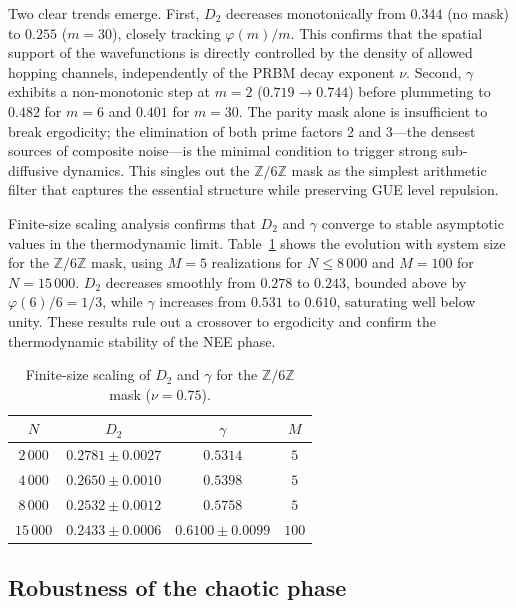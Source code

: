 \documentclass[11pt,a4paper]{article}
\begin{document}
Two clear trends emerge. First, $D_2$ decreases monotonically from $0.344$ (no mask) to $0.255$ ($m=30$), closely tracking $\varphi(m)/m$. This confirms that the spatial support of the wavefunctions is directly controlled by the density of allowed hopping channels, independently of the PRBM decay exponent $\nu$. Second, $\gamma$ exhibits a non-monotonic step at $m=2$ ($0.719 \to 0.744$) before plummeting to $0.482$ for $m=6$ and $0.401$ for $m=30$. The parity mask alone is insufficient to break ergodicity; the elimination of both prime factors 2 and 3---the densest sources of composite noise---is the minimal condition to trigger strong sub-diffusive dynamics. This singles out the $\mathbb{Z}/6\mathbb{Z}$ mask as the simplest arithmetic filter that captures the essential structure while preserving GUE level repulsion.

Finite-size scaling analysis confirms that $D_2$ and $\gamma$ converge to stable asymptotic values in the thermodynamic limit. Table~\ref{tab:scaling} shows the evolution with system size for the $\mathbb{Z}/6\mathbb{Z}$ mask, using $M=5$ realizations for $N \le 8\,000$ and $M=100$ for $N=15\,000$. $D_2$ decreases smoothly from $0.278$ to $0.243$, bounded above by $\varphi(6)/6 = 1/3$, while $\gamma$ increases from $0.531$ to $0.610$, saturating well below unity. These results rule out a crossover to ergodicity and confirm the thermodynamic stability of the NEE phase.

\begin{table}[ht]
\caption{Finite-size scaling of $D_2$ and $\gamma$ for the $\mathbb{Z}/6\mathbb{Z}$ mask ($\nu=0.75$).}
\label{tab:scaling}
\centering
\begin{tabular}{c c c c}
\hline\hline
$N$ & $D_2$ & $\gamma$ & $M$ \\
\hline
$2\,000$  & $0.2781 \pm 0.0027$ & $0.5314$ & $5$ \\
$4\,000$  & $0.2650 \pm 0.0010$ & $0.5398$ & $5$ \\
$8\,000$  & $0.2532 \pm 0.0012$ & $0.5758$ & $5$ \\
$15\,000$ & $0.2433 \pm 0.0006$ & $0.6100 \pm 0.0099$ & $100$ \\
\hline\hline
\end{tabular}
\end{table}

\subsection{Robustness of the chaotic phase}
\end{document}
